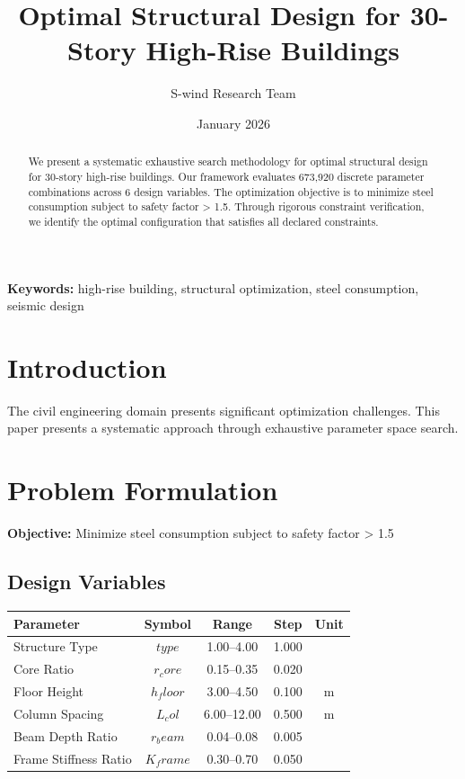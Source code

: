 \documentclass[11pt,a4paper]{article}
\title{Optimal Structural Design for 30-Story High-Rise Buildings}
\author{S-wind Research Team}
\date{January 2026}
\begin{document}
\maketitle

\begin{abstract}
We present a systematic exhaustive search methodology for optimal structural design for 30-story high-rise buildings. Our framework evaluates 673,920 discrete parameter combinations across 6 design variables. The optimization objective is to minimize steel consumption subject to safety factor > 1.5. Through rigorous constraint verification, we identify the optimal configuration that satisfies all declared constraints.
\end{abstract}

\textbf{Keywords:} high-rise building, structural optimization, steel consumption, seismic design

\section{Introduction}

The civil engineering domain presents significant optimization challenges. This paper presents a systematic approach through exhaustive parameter space search.

\section{Problem Formulation}

\textbf{Objective:} Minimize steel consumption subject to safety factor > 1.5

\subsection{Design Variables}

\begin{center}
\begin{tabular}{|l|c|c|c|c|}
\hline
Parameter & Symbol & Range & Step & Unit \\
\hline
Structure Type & $type$ & 1.00--4.00 & 1.000 &  \\
Core Ratio & $r_core$ & 0.15--0.35 & 0.020 &  \\
Floor Height & $h_floor$ & 3.00--4.50 & 0.100 & m \\
Column Spacing & $L_col$ & 6.00--12.00 & 0.500 & m \\
Beam Depth Ratio & $r_beam$ & 0.04--0.08 & 0.005 &  \\
Frame Stiffness Ratio & $K_frame$ & 0.30--0.70 & 0.050 &  \\
\hline
\end{tabular}
\end{center}
\end{document}
